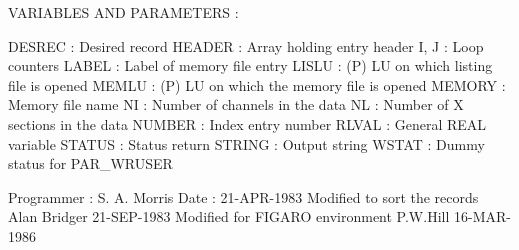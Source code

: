 \begin{description}
\begin{terminalv}
  VARIABLES AND PARAMETERS :

  DESREC : Desired record
  HEADER : Array holding entry header
  I, J   : Loop counters
  LABEL  : Label of memory file entry
  LISLU  : (P) LU on which listing file is opened
  MEMLU  : (P) LU on which the memory file is opened
  MEMORY : Memory file name
  NI     : Number of channels in the data
  NL     : Number of X sections in the data
  NUMBER : Index entry number
  RLVAL  : General REAL variable
  STATUS : Status return
  STRING : Output string
  WSTAT  : Dummy status for PAR_WRUSER


  Programmer :  S. A. Morris            Date :  21-APR-1983
  Modified to sort the records    Alan Bridger  21-SEP-1983
  Modified for FIGARO environment     P.W.Hill  16-MAR-1986
\end{terminalv}
\end{description}

